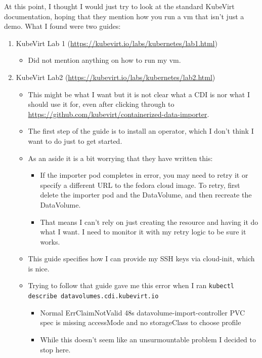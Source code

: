 \documentclass{kththesis}
\begin{document}
\begin{enumerate}
\begin{itemize}
At this point, I thought I would just try to look at the standard KubeVirt documentation, hoping that they mention how you run a \Gls{vm} that isn't just a demo.
What I found were two guides:
\begin{enumerate}
    \item KubeVirt Lab 1 (\url{https://kubevirt.io/labs/kubernetes/lab1.html})
    \begin{itemize}
        \item Did not mention anything on how to run my \Gls{vm}.
    \end{itemize}
    \item KubeVirt Lab2 (\url{https://kubevirt.io/labs/kubernetes/lab2.html})
    \begin{itemize}
        \item This might be what I want but it is not clear what a CDI is nor what I should use it for, even after clicking through to \url{https://github.com/kubevirt/containerized-data-importer}.
        \item The first step of the guide is to install an operator, which I don't think I want to do just to get started.
        \item As an aside it is a bit worrying that they have written this:
        \begin{itemize}
            \item If the importer pod completes in error, you may need to retry it or specify a different URL to the fedora cloud image. To retry, first delete the importer pod and the DataVolume, and then recreate the DataVolume.
            \item That means I can't rely on just creating the resource and having it do what I want. I need to monitor it with my retry logic to be sure it works.
        \end{itemize}
        \item This guide specifies how I can provide my SSH keys via cloud-init, which is nice.
        \item Trying to follow that guide gave me this error when I ran \texttt{kubectl describe datavolumes.cdi.kubevirt.io}
        \begin{itemize}
            \item Normal   ErrClaimNotValid  48s                datavolume-import-controller  PVC spec is missing accessMode and no storageClass to choose profile
            \item While this doesn't seem like an unsurmountable problem I decided to stop here.
        \end{itemize}
    \end{itemize}
\end{enumerate}


\end{itemize}
\end{enumerate}
\end{document}

